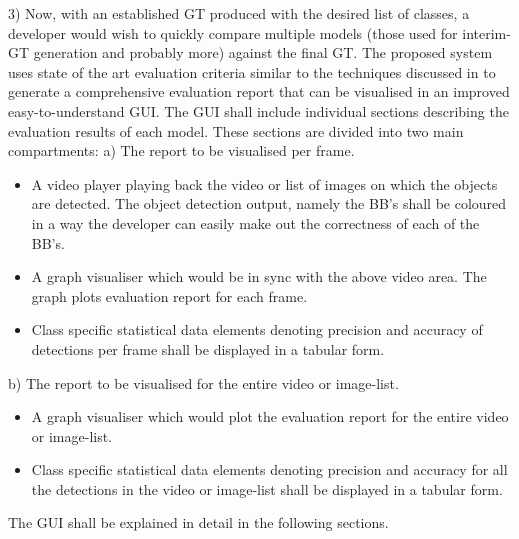 \documentclass[conference]{IEEEtran}
\begin{document}
3) Now, with an established GT produced with the desired list of classes, a developer would wish to quickly compare multiple models (those used for interim-GT generation and probably more) against the final GT. The proposed system uses state of the art evaluation criteria similar to the techniques discussed in \cite{everingham2010vocchallenge} to generate a comprehensive evaluation report that can be visualised in an improved easy-to-understand GUI.
The GUI shall include individual sections describing the evaluation results of each model. These sections are divided into two main compartments:
a) The report to be visualised per frame.
\begin{itemize}
	\item A video player playing back the video or list of images on which the objects are detected. The object detection output, namely the BB's shall be coloured in a way the developer can easily make out the correctness of each of the BB's.
	\item A graph visualiser which would be in sync with the above video area. The graph plots evaluation report for each frame.
	\item Class specific statistical data elements denoting precision and accuracy of detections per frame shall be displayed in a tabular form.
\end{itemize}
b) The report to be visualised for the entire video or image-list.
\begin{itemize}
	\item A graph visualiser which would plot the evaluation report for the entire video or image-list.
	\item Class specific statistical data elements denoting precision and accuracy for all the detections in the video or image-list shall be displayed in a tabular form.
\end{itemize}
The GUI shall be explained in detail in the following sections.
\end{document}
